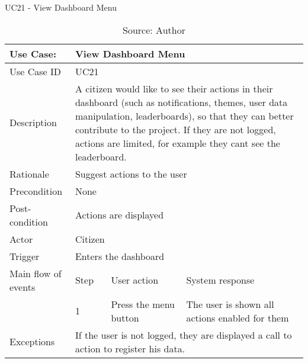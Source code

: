 \begin{table}[h]
\centering
\caption{UC21 - View Dashboard Menu}
\label{uc:21}
\begin{tabular}{|p{3cm}|p{1cm}|p{5cm}|p{5cm}|}
\hline
Use Case:       & \multicolumn{3}{p{11cm}|}{View Dashboard Menu} \\ \hline
Use Case ID     & \multicolumn{3}{p{11cm}|}{UC21} \\ \hline
Description     & \multicolumn{3}{p{11cm}|}{A citizen would like to see their actions in their dashboard (such as notifications, themes, user data manipulation, leaderboards), so that they can better contribute to the project. If they are not logged, actions are limited, for example they cant see the leaderboard.} \\ \hline
Rationale       & \multicolumn{3}{p{11cm}|}{Suggest actions to the user} \\ \hline
Precondition    & \multicolumn{3}{p{11cm}|}{None} \\ \hline
Post-condition  & \multicolumn{3}{p{11cm}|}{Actions are displayed} \\ \hline
Actor           & \multicolumn{3}{p{11cm}|}{Citizen} \\ \hline
Trigger         & \multicolumn{3}{p{11cm}|}{Enters the dashboard} \\ \hline
Main flow of events & Step  & User action & System response \\ \hline
                    & 1     & Press the menu button & The user is shown all actions enabled for them \\ \hline
Exceptions      & \multicolumn{3}{p{11cm}|}{If the user is not logged, they are displayed a call to action to register his data.} \\ \hline
\end{tabular}
\caption*{Source: Author}
\end{table}

